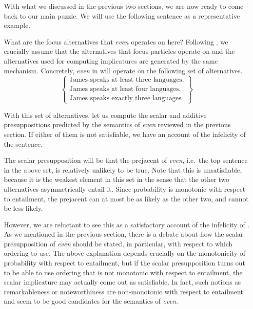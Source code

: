 \documentclass[output=paper]{langscibook}
\begin{document}
With what we discussed in the previous two sections, we are now ready to come back to our main puzzle. We will use the following sentence as a representative example.

    \z

\noindent What are the focus alternatives that \textit{even} operates on here? Following \citet{foxkatzir}, we crucially assume that the alternatives that focus particles operate on and the alternatives used for computing implicatures are generated by the same mechanism. Concretely, \textit{even} in  will operate on the following set of alternatives.
  \[\left\{\begin{array}{l}
    \text{James speaks at least three languages,}\\
    \text{James speaks {at least four} languages,}\\
    \text{James speaks {exactly three} languages}
  \end{array}\right\}\]

\noindent With this set of alternatives, let us compute the scalar and additive presuppositions predicted by the semantics of \textit{even} reviewed in the previous section. If either of them is not satisfiable, we have an account of the infelicity of the sentence.\largerpage

The scalar presupposition will be that the prejacent of \textit{even}, i.e.\ the top sentence in the above set, is relatively unlikely to be true. Note that this is unsatisfiable, because it is the weakest element in this set in the sense that the other two alternatives asymmetrically entail it. Since probability is monotonic with respect to entailment, the prejacent can at most be as likely as the other two, and cannot be less likely.

However, we are reluctant to see this as a satisfactory account of the infelicity of . As we mentioned in the previous section, there is a debate about how the scalar presupposition of \textit{even} should be stated, in particular, with respect to which ordering to use. The above explanation depends crucially on the monotonicity of probability with respect to entailment, but if the scalar presupposition turns out to be able to use ordering that is not monotonic with respect to entailment, the scalar implicature may actually come out as satisfiable. In fact, such notions as remarkableness or noteworthiness are non-monotonic with respect to entailment and seem to be good candidates for the semantics of \textit{even}.
\end{document}
